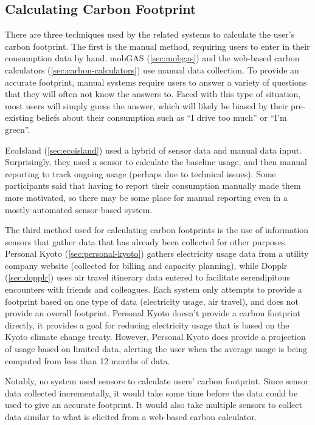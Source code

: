\subsection{Calculating Carbon Footprint}

There are three techniques used by the related systems to calculate the user's carbon footprint. The first is the manual method, requiring users to enter in their consumption data by hand. mobGAS (\autoref{sec:mobgas}) and the web-based carbon calculators (\autoref{sec:carbon-calculators}) use manual data collection. To provide an accurate footprint, manual systems require users to answer a variety of questions that they will often not know the answers to. Faced with this type of situation, most users will simply guess the answer, which will likely be biased by their pre-existing beliefs about their consumption such as ``I drive too much'' or ``I'm green''.

EcoIsland (\autoref{sec:ecoisland}) used a hybrid of sensor data and manual data input. Surprisingly, they used a sensor to calculate the baseline usage, and then manual reporting to track ongoing usage (perhaps due to technical issues). Some participants said that having to report their consumption manually made them more motivated, so there may be some place for manual reporting even in a mostly-automated sensor-based system.

The third method used for calculating carbon footprints is the use of information sensors that gather data that has already been collected for other purposes. Personal Kyoto (\autoref{sec:personal-kyoto}) gathers electricity usage data from a utility company website (collected for billing and capacity planning), while Dopplr (\autoref{sec:dopplr}) uses air travel itinerary data entered to facilitate serendipitous encounters with friends and colleagues. Each system only attempts to provide a footprint based on one type of data (electricity usage, air travel), and does not provide an overall footprint. Personal Kyoto doesn't provide a carbon footprint directly, it provides a goal for reducing electricity usage that is based on the Kyoto climate change treaty. However, Personal Kyoto does provide a projection of usage based on limited data, alerting the user when the average usage is being computed from less than 12 months of data.

Notably, no system used sensors to calculate users' carbon footprint. Since sensor data collected incrementally, it would take some time before the data could be used to give an accurate footprint. It would also take multiple sensors to collect data similar to what is elicited from a web-based carbon calculator.

